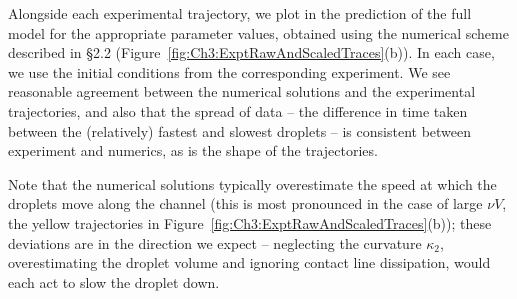 Alongside each experimental trajectory, we plot in  the prediction of the full model for the appropriate parameter values, obtained using the numerical scheme described in \S2.2 (Figure~\ref{fig:Ch3:ExptRawAndScaledTraces}(b)). In each case, we use the initial conditions from the corresponding experiment. We see reasonable agreement between the numerical solutions and the experimental trajectories, and also that the spread of data -- the difference in time taken between the (relatively) fastest and slowest droplets --  is consistent between experiment and numerics, as is the shape of the trajectories.

Note that the numerical solutions typically overestimate the speed at which the droplets move along the channel (this is most pronounced in the case of large $\nu V$,  the yellow trajectories in Figure~\ref{fig:Ch3:ExptRawAndScaledTraces}(b)); these deviations are in the direction we expect -- neglecting the curvature $\kappa_2$, overestimating the droplet volume and ignoring contact line dissipation, would  each act to slow the droplet down.



